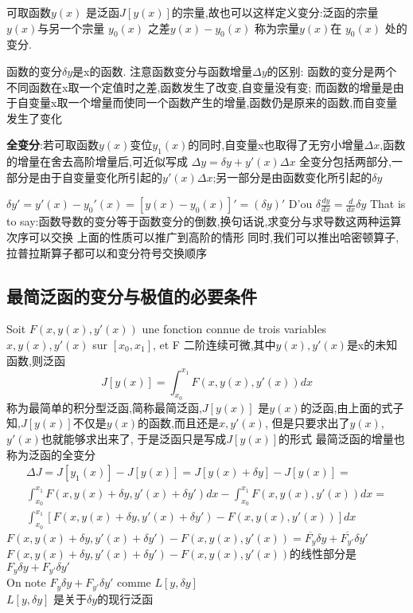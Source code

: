 \documentclass{book}
\begin{document}
可取函数$y(x)$ 是泛函$J[y(x)]$的宗量,故也可以这样定义变分:泛函的宗量$y(x)$与另一个宗量 $y_0(x)$ 之差$y(x)-y_0(x)$ 称为宗量$y(x)$在 $y_0(x)$ 处的变分.

\begin{attention}
函数的变分$\delta y$是x的函数.\newline
注意函数变分与函数增量$\Delta y$的区别:\newline
函数的变分是两个不同函数在x取一个定值时之差,函数发生了改变,自变量没有变;\newline
而函数的增量是由于自变量x取一个增量而使同一个函数产生的增量,函数仍是原来的函数,而自变量发生了变化
\end{attention}

\textbf{全变分}:若可取函数$y(x)$变位$y_1(x)$的同时,自变量x也取得了无穷小增量$\Delta x$,函数的增量在舍去高阶增量后,可近似写成\newline
$\Delta y=\delta y + y'(x)\Delta x$
\newline
全变分包括两部分,一部分是由于自变量变化所引起的$y'(x)\Delta x$;另一部分是由函数变化所引起的$\delta y $

$\delta y'=y'(x)-y_0'(x)=[y(x)-y_0(x)]'=(\delta y)'$
D'ou $\delta \frac{dy}{dx}=\frac{d}{dx}\delta y$
\newline
That is to say:函数导数的变分等于函数变分的倒数,换句话说,求变分与求导数这两种运算次序可以交换
\newline
上面的性质可以推广到高阶的情形
同时,我们可以推出哈密顿算子,拉普拉斯算子都可以和变分符号交换顺序

\subsection{最简泛函的变分与极值的必要条件}
Soit $F(x,y(x),y'(x))$ une fonction connue de trois variables $x,y(x),y'(x)$ sur $[x_0,x_1]$, et F 二阶连续可微,其中$y(x),y'(x)$是x的未知函数,则泛函 \newline
$$J[y(x)]=\int_{x_0}^{x_1}F(x,y(x),y'(x))dx$$
称为最简单的积分型泛函,简称最简泛函,$J[y(x)]$ 是$y(x)$的泛函,由上面的式子知,$J[y(x)]$不仅是$y(x)$的函数,而且还是$x,y'(x)$, 但是只要求出了$y(x)$, $y'(x)$也就能够求出来了, 于是泛函只是写成$J[y(x)]$的形式
\newline
最简泛函的增量也称为泛函的全变分
\begin{equation}
\begin{split}
  \Delta J=J[y_1(x)]-J[y(x)]=J[y(x)+\delta y]-J[y(x)]= \\
\int_{x_0}^{x_1}F(x,y(x)+\delta y,y'(x)+\delta y')dx-\int_{x_0}^{x_1}F(x,y(x),y'(x))dx = \\
\int_{x_0}^{x_1}[F(x,y(x)+\delta y,y'(x)+\delta y')-F(x,y(x),y'(x))]dx
 \end{split}
\end{equation}
$F(x,y(x)+\delta y,y'(x)+\delta y')-F(x,y(x),y'(x))=\overline{F_y}\delta y + \overline{F_{y'}}\delta y'$ \newline
$F(x,y(x)+\delta y,y'(x)+\delta y')-F(x,y(x),y'(x))$的线性部分是$F_y\delta y + F_{y'}\delta y'$ \\
On note $F_y\delta y + F_{y'}\delta y'$ comme $L[y,\delta y]$ \\
$L[y,\delta y]$ 是关于$\delta y$的现行泛函
\end{document}
